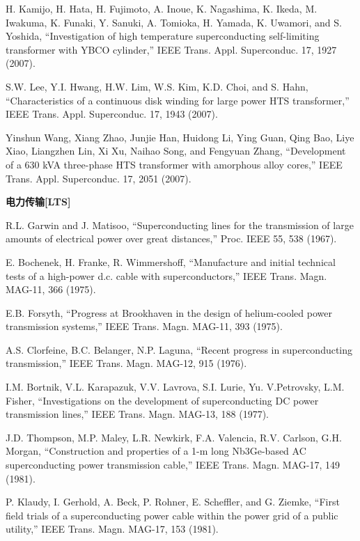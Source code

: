 \noindent [9.169] H. Kamijo, H. Hata, H. Fujimoto, A. Inoue, K. Nagashima, K. Ikeda, M. Iwakuma,
K. Funaki, Y. Sanuki, A. Tomioka, H. Yamada, K. Uwamori, and S. Yoshida,
``Investigation of high temperature superconducting self-limiting transformer with
YBCO cylinder,” IEEE Trans. Appl. Superconduc. 17, 1927 (2007).

\noindent [9.170] S.W. Lee, Y.I. Hwang, H.W. Lim, W.S. Kim, K.D. Choi, and S. Hahn, ``Characteristics
of a continuous disk winding for large power HTS transformer,” IEEE
Trans. Appl. Superconduc. 17, 1943 (2007).

\noindent [9.171] Yinshun Wang, Xiang Zhao, Junjie Han, Huidong Li, Ying Guan, Qing Bao, Liye
Xiao, Liangzhen Lin, Xi Xu, Naihao Song, and Fengyuan Zhang, ``Development
of a 630 kVA three-phase HTS transformer with amorphous alloy cores,” IEEE
Trans. Appl. Superconduc. 17, 2051 (2007).

\noindent \textbf{电力传输[LTS] }

\noindent [9.172] R.L. Garwin and J. Matisoo, ``Superconducting lines for the transmission of large
amounts of electrical power over great distances,” Proc. IEEE 55, 538 (1967).

\noindent [9.173] E. Bochenek, H. Franke, R. Wimmershoff, ``Manufacture and initial technical tests
of a high-power d.c. cable with superconductors,” IEEE Trans. Magn. MAG-11,
366 (1975).

\noindent [9.174] E.B. Forsyth, ``Progress at Brookhaven in the design of helium-cooled power
transmission systems,” IEEE Trans. Magn. MAG-11, 393 (1975).

\noindent [9.175] A.S. Clorfeine, B.C. Belanger, N.P. Laguna, ``Recent progress in superconducting
transmission,” IEEE Trans. Magn. MAG-12, 915 (1976).

\noindent [9.176] I.M. Bortnik, V.L. Karapazuk, V.V. Lavrova, S.I. Lurie, Yu. V.Petrovsky, L.M.
Fisher, ``Investigations on the development of superconducting DC power transmission
lines,” IEEE Trans. Magn. MAG-13, 188 (1977).

\noindent [9.177] J.D. Thompson, M.P. Maley, L.R. Newkirk, F.A. Valencia, R.V. Carlson, G.H.
Morgan, ``Construction and properties of a 1-m long Nb3Ge-based AC superconducting
power transmission cable,” IEEE Trans. Magn. MAG-17, 149 (1981).

\noindent [9.178] P. Klaudy, I. Gerhold, A. Beck, P. Rohner, E. Scheffler, and G. Ziemke, ``First
field trials of a superconducting power cable within the power grid of a public
utility,” IEEE Trans. Magn. MAG-17, 153 (1981).

